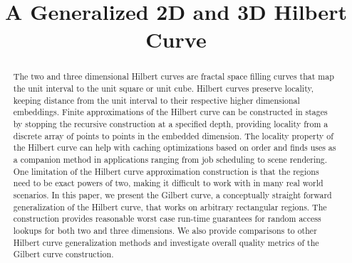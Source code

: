 \documentclass[
twocolumn,
]{ceurart}
\begin{document}



\title{ A Generalized 2D and 3D Hilbert Curve }



\begin{abstract}
The two and three dimensional Hilbert curves are fractal space filling curves that
map the unit interval to the unit square or unit cube.
Hilbert curves preserve locality, keeping distance from the unit interval
to their respective higher dimensional embeddings.
Finite approximations of the Hilbert curve can be constructed in stages
by stopping the recursive construction at a specified depth, providing locality
from a discrete array of points to points in the embedded dimension.
The locality property of the Hilbert curve can help with caching optimizations based on order
and finds uses as a companion method in applications ranging from job scheduling
to scene rendering.
One limitation of the Hilbert curve approximation construction is that the regions need
to be exact powers of two, making it difficult to work with in many real world
scenarios.
In this paper, we present the Gilbert curve,
a conceptually straight forward generalization of the Hilbert curve,
that works on arbitrary rectangular regions.
The construction provides reasonable worst case run-time guarantees for random
access lookups for both two and three dimensions.
We also provide comparisons to other Hilbert curve generalization methods
and investigate overall quality metrics of the Gilbert curve construction.
\end{abstract}

\maketitle

\newcommand{\specialcell}[2][c]{\begin{tabular}[#1]{@{}l@{}}#2\end{tabular}}
\newcommand{\specialcellCenter}[2][c]{\begin{tabular}[#1]{@{}c@{}}#2\end{tabular}}








%


\appendix

\end{document}
